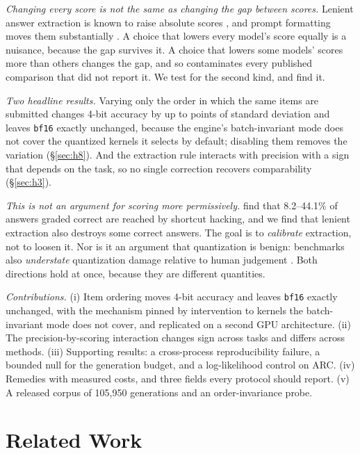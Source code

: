\documentclass[conference]{IEEEtran}
\begin{document}
\emph{Changing every score is not the same as changing the gap between scores.} Lenient
answer extraction is known to raise absolute scores \citep{jo2025finding,yu2025xfinder}, and
prompt formatting moves them substantially \citep{sclar2024formatspread}. A choice that
lowers every model's score equally is a nuisance, because the gap survives it. A choice that
lowers some models' scores more than others changes the gap, and so contaminates every
published comparison that did not report it. We test for the second kind, and find it.

\emph{Two headline results.} Varying only the order in which the same items are submitted
changes 4-bit accuracy by up to \hEightWorstSDTen{} points of standard deviation and leaves
\texttt{bf16} exactly unchanged, because the engine's batch-invariant mode does not cover
the quantized kernels it selects by default; disabling them removes the variation
(\S\ref{sec:h8}). And the extraction rule interacts with precision with a sign that depends
on the task, so no single correction recovers comparability (\S\ref{sec:h3}).

\emph{This is not an argument for scoring more permissively.} \citet{ren2026shortcut} find
that 8.2--44.1\% of answers graded correct are reached by shortcut hacking, and we find that
lenient extraction also destroys some correct answers. The goal is to \emph{calibrate}
extraction, not to loosen it. Nor is it an argument that quantization is benign: benchmarks
also \emph{understate} quantization damage relative to human judgement
\citep{marchisio2024multilingual,dutta2024accuracy}. Both directions hold at once, because
they are different quantities.

\emph{Contributions.} (i) Item ordering moves 4-bit accuracy and leaves \texttt{bf16} exactly
unchanged, with the mechanism pinned by intervention to kernels the batch-invariant mode does
not cover, and replicated on a second GPU architecture. (ii) The precision-by-scoring
interaction changes sign across tasks and differs across methods. (iii) Supporting results:
a cross-process reproducibility failure, a bounded null for the generation budget, and a
log-likelihood control on ARC. (iv) Remedies with measured costs, and three fields every
protocol should report. (v) A released corpus of 105{,}950 generations and an
order-invariance probe.

\section{Related Work}
\label{sec:related}
\end{document}
